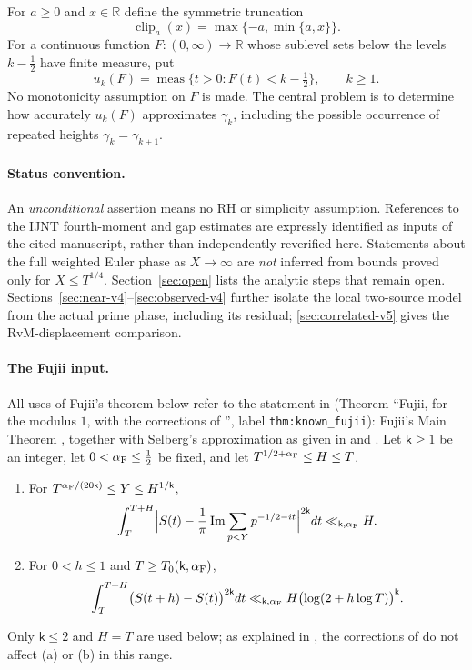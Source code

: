 \documentclass[11pt,a4paper]{article}
\numberwithin{equation}{section}
\theoremstyle{definition}
\theoremstyle{remark}
\newcommand{\meas}{\operatorname{meas}}
\newcommand{\clip}{\operatorname{clip}}
\begin{document}
For $a\ge0$ and $x\in\mathbb R$ define the symmetric truncation
\begin{equation}\label{eq:clip}
\clip_a(x)=\max\{-a,\min\{a,x\}\}.
\end{equation}
For a continuous function $F:(0,\infty)\to\mathbb R$ whose sublevel sets below the levels $k-\frac12$ have finite measure, put
\begin{equation}\label{eq:sublevel}
u_k(F)=\meas\{t>0:F(t)<k-\tfrac12\},\qquad k\ge1.
\end{equation}
No monotonicity assumption on $F$ is made. The central problem is to determine how accurately $u_k(F)$ approximates $\gamma_k$, including the possible occurrence of repeated heights $\gamma_k=\gamma_{k+1}$.

\paragraph{Status convention.}
An \emph{unconditional} assertion means no RH or simplicity assumption. References to the IJNT fourth-moment and gap estimates are expressly identified as inputs of the cited manuscript, rather than independently reverified here. Statements about the full weighted Euler phase as $X\to\infty$ are \emph{not} inferred from bounds proved only for $X\le T^{1/4}$. Section~\ref{sec:open} lists the analytic steps that remain open. Sections~\ref{sec:near-v4}--\ref{sec:observed-v4} further isolate the local two-source model from the actual prime phase, including its residual; \cref{sec:correlated-v5} gives the RvM-displacement comparison.

\paragraph{The Fujii input.}
All uses of Fujii's theorem below refer to the statement in \cite{CasanaIJNT} (Theorem ``Fujii, for the modulus $1$, with the corrections of \cite[\S5]{Fujii1981}'', label \texttt{thm:known\_fujii}): Fujii's Main Theorem \cite[p.~225]{Fujii1974}, together with Selberg's approximation as given in \cite[\S3, pp.~232--233]{Fujii1974} and \cite[Lemma~5]{Fujii1974}. Let $\mathsf k\ge1$ be an integer, let $0<\alpha_{\rm F}\le\frac12$ be fixed, and let $T^{1/2+\alpha_{\rm F}}\le H\le T$.
\begin{enumerate}[label=(\alph*),leftmargin=*]
\item For $T^{\alpha_{\rm F}/(20\mathsf k)}\le Y\le H^{1/\mathsf k}$,
\begin{equation}\label{eq:FujiiA}
\int_T^{T+H}\Bigl|S(t)-\frac1\pi\operatorname{Im}\sum_{p<Y}p^{-1/2-it}\Bigr|^{2\mathsf k}dt\ll_{\mathsf k,\alpha_{\rm F}}H.
\end{equation}
\item For $0<h\le1$ and $T\ge T_0(\mathsf k,\alpha_{\rm F})$,
\begin{equation}\label{eq:FujiiB}
\int_T^{T+H}\bigl(S(t+h)-S(t)\bigr)^{2\mathsf k}dt\ll_{\mathsf k,\alpha_{\rm F}}H\bigl(\log(2+h\log T)\bigr)^{\mathsf k}.
\end{equation}
\end{enumerate}
Only $\mathsf k\le2$ and $H=T$ are used below; as explained in \cite{CasanaIJNT}, the corrections of \cite[\S5]{Fujii1981} do not affect (a) or (b) in this range.
\end{document}
